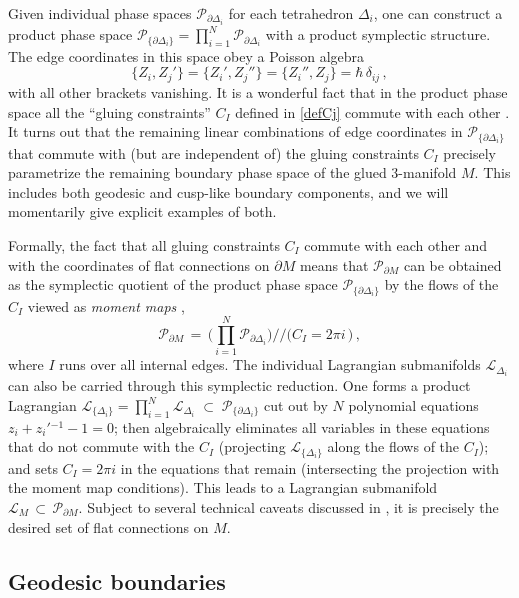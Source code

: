 \documentclass[hyper,letterpaper]{JHEP3}
\numberwithin{equation}{section}
\newcommand{\be}{\begin{equation}}
\newcommand{\ee}{\end{equation}}
\newcommand{\pd}{\partial}
\newcommand{\CL}{\mathcal{L}}
\newcommand{\CP}{\mathcal{P}}
\begin{document}
Given individual phase spaces $\CP_{\pd\Delta_i}$ for each tetrahedron $\Delta_i$, one can construct a product phase space $\CP_{\{\pd\Delta_i\}}=\prod_{i=1}^N \CP_{\pd\Delta_i}$ with a product symplectic structure. The edge coordinates in this space obey a Poisson algebra
%
\be \{Z_i,Z_j'\} = \{Z_i',Z_j''\}= \{Z_i'',Z_j\} = \hbar\,\delta_{ij}\,,\ee
%
with all other brackets vanishing. It is a wonderful fact that in the product phase space all the ``gluing constraints'' $C_I$ defined in \eqref{defCj} commute with each other \cite{NZ}. It turns out that the remaining linear combinations of edge coordinates in $\CP_{\{\pd\Delta_i\}}$ that commute with (but are independent of) the gluing constraints $C_I$ precisely parametrize the remaining boundary phase space of the glued 3-manifold $M$. This includes both geodesic and cusp-like boundary components, and we will momentarily give explicit examples of both.


Formally, the fact that all gluing constraints $C_I$ commute with each other and with the coordinates of flat connections on $\pd M$ means that $\CP_{\pd M}$ can be obtained as the symplectic quotient of the product phase space $\CP_{\{\pd\Delta_i\}}$ by the flows of the $C_I$ viewed as \emph{moment maps} \cite{Dimofte-QRS},
%
\be \CP_{\pd M}\,=\, \bigg(\prod_{i=1}^N \CP_{\pd\Delta_i}\bigg)\Big/\!\!\!\Big/\big(C_I=2\pi i\,\big) \,,\ee
%
where $I$ runs over all internal edges.
The individual Lagrangian submanifolds $\CL_{\Delta_i}$ can also be carried through this symplectic reduction. One forms a product Lagrangian $\CL_{\{\Delta_i\}}=\prod_{i=1}^N\CL_{\Delta_i}\;\subset\;\CP_{\{\pd\Delta_i\}}$ cut out by $N$ polynomial equations $z_i+z_i'{}^{-1}-1=0$; then algebraically eliminates all variables in these equations that do not commute with the $C_I$ (projecting $\CL_{\{\Delta_i\}}$ along the flows of the $C_I$); and sets $C_I=2\pi i$ in the equations that remain (intersecting the projection with the moment map conditions). This leads to a Lagrangian submanifold $\CL_M\,\subset\,\CP_{\pd M}$. Subject to several technical caveats discussed in \cite{Dimofte-QRS}, it is precisely the desired set of flat connections on $M$.








\subsection{Geodesic boundaries}
\label{sec:geobdy}
\end{document}
